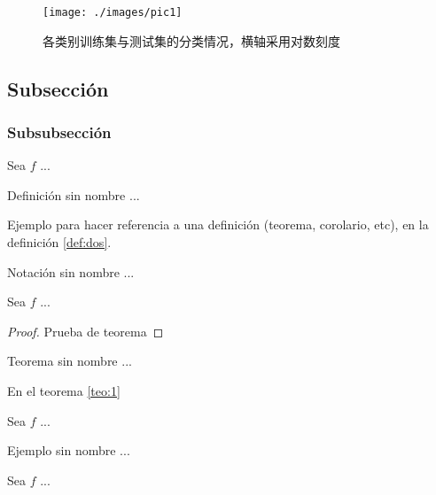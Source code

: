 \documentclass[fleqn]{Paquetes/RevDigMatEduInt}
\begin{document}
\begin{figure}[h]
	\centering
	\texttt{[image: ./images/pic1]}
	\caption{各类别训练集与测试集的分类情况，横轴采用对数刻度}
\end{figure}



\subsection{Subsección}

\subsubsection{Subsubsección}


\begin{definicion}
	Sea $f$ ...
\end{definicion}

\begin{definicion}
Definición sin nombre ...
\end{definicion}

Ejemplo para hacer referencia a una definición (teorema, corolario, etc), en la definición \ref{def:dos}.

\begin{notacion}
	Notación sin nombre ...
\end{notacion}

\begin{teorema}
	Sea $f$ ...
\end{teorema}

\begin{proof}
	Prueba de teorema
\end{proof}

\begin{teorema}
Teorema sin nombre ...
\end{teorema}

En el teorema \ref{teo:1}

\begin{ejemplo}
	Sea $f$ ...
\end{ejemplo}

\begin{ejemplo}
	Ejemplo sin nombre ...
\end{ejemplo}

\begin{corolario}
	Sea $f$ ...
\end{corolario}
\end{document}
